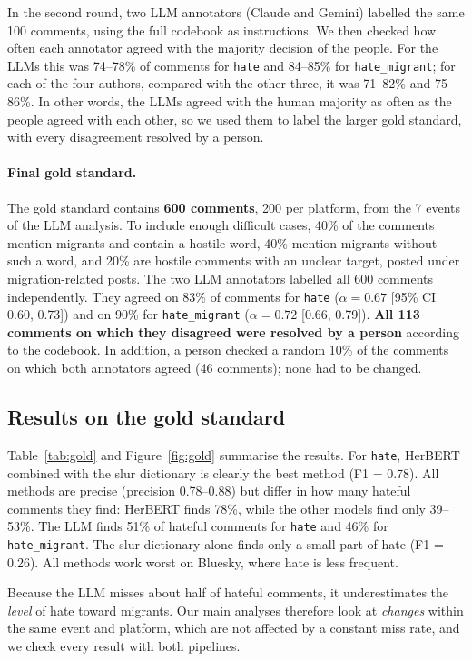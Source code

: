 \documentclass[11pt]{article}
\begin{document}
In the second round, two LLM annotators (Claude and Gemini) labelled the same 100 comments, using the full codebook as instructions. We then checked how often each annotator agreed with the majority decision of the people. For the LLMs this was 74--78\% of comments for \texttt{hate} and 84--85\% for \texttt{hate\_migrant}; for each of the four authors, compared with the other three, it was 71--82\% and 75--86\%. In other words, the LLMs agreed with the human majority as often as the people agreed with each other, so we used them to label the larger gold standard, with every disagreement resolved by a person.

\paragraph{Final gold standard.} The gold standard contains \textbf{600 comments}, 200 per platform, from the 7 events of the LLM analysis. To include enough difficult cases, 40\% of the comments mention migrants and contain a hostile word, 40\% mention migrants without such a word, and 20\% are hostile comments with an unclear target, posted under migration-related posts. The two LLM annotators labelled all 600 comments independently. They agreed on 83\% of comments for \texttt{hate} ($\alpha = 0.67$ [95\% CI 0.60, 0.73]) and on 90\% for \texttt{hate\_migrant} ($\alpha = 0.72$ [0.66, 0.79]). \textbf{All 113 comments on which they disagreed were resolved by a person} according to the codebook. In addition, a person checked a random 10\% of the comments on which both annotators agreed (46 comments); none had to be changed.

\subsection{Results on the gold standard}

Table~\ref{tab:gold} and Figure~\ref{fig:gold} summarise the results. For \texttt{hate}, HerBERT combined with the slur dictionary is clearly the best method (F1 = 0.78). All methods are precise (precision 0.78--0.88) but differ in how many hateful comments they find: HerBERT finds 78\%, while the other models find only 39--53\%. The LLM finds 51\% of hateful comments for \texttt{hate} and 46\% for \texttt{hate\_migrant}. The slur dictionary alone finds only a small part of hate (F1 = 0.26). All methods work worst on Bluesky, where hate is less frequent.

Because the LLM misses about half of hateful comments, it underestimates the \emph{level} of hate toward migrants. Our main analyses therefore look at \emph{changes} within the same event and platform, which are not affected by a constant miss rate, and we check every result with both pipelines.
\end{document}
